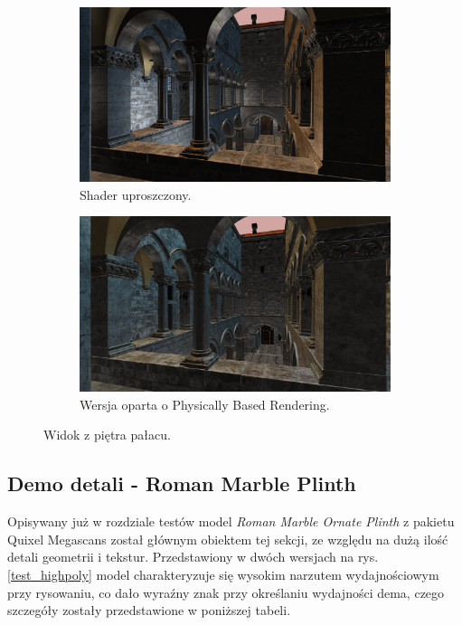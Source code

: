 \begin{figure}[h!]
	\centering
	\begin{subfigure}{.4\textwidth}
		\includegraphics[width=\textwidth]{images/demo_sponza_4.png}
		\caption{Shader uproszczony.}
	\end{subfigure}
	\begin{subfigure}{.4\textwidth}
		\includegraphics[width=\textwidth]{images/demo_sponza_4_pbr.png}
		\caption{Wersja oparta o Physically Based Rendering.}
	\end{subfigure}
	\caption{Widok z piętra pałacu.}
	\label{test_sponza_3}
\end{figure}

\vfill
\clearpage

\subsection{Demo detali - Roman Marble Plinth}
Opisywany już w rozdziale testów model \textit{Roman Marble Ornate Plinth} z pakietu Quixel Megascans został głównym obiektem tej sekcji, ze względu na dużą ilość detali geometrii i tekstur. Przedstawiony w dwóch wersjach na rys. \ref{test_highpoly} model charakteryzuje się wysokim narzutem wydajnościowym przy rysowaniu, co dało wyraźny znak przy określaniu wydajności dema, czego szczegóły zostały przedstawione w poniższej tabeli.

